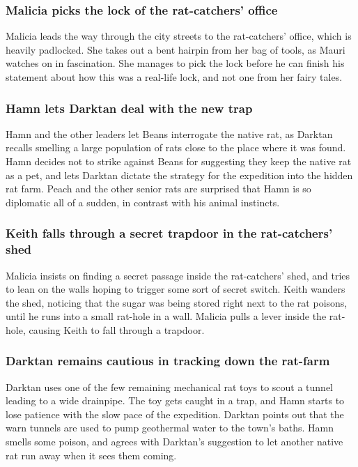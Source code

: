 \subsubsection{\Gls{Malicia} picks the lock of the rat-catchers' office}
\Gls{Malicia} leads the way through the city streets to the rat-catchers' office, which is heavily
padlocked. She takes out a bent hairpin from her bag of tools, as \Gls{Mauri} watches on in
fascination. She manages to pick the lock before he can finish his statement about how this was a
real-life lock, and not one from her fairy tales.

\subsubsection{\Gls{Hamn} lets \Gls{Darktan} deal with the new trap}
\Gls{Hamn} and the other leaders let \Gls{Beans} interrogate the native rat, as \Gls{Darktan}
recalls smelling a large population of rats close to the place where it was found. \Gls{Hamn}
decides not to strike against \Gls{Beans} for suggesting they keep the native rat as a pet, and lets
\Gls{Darktan} dictate the strategy for the expedition into the hidden rat farm. \Gls{Peach} and the
other senior rats are surprised that \Gls{Hamn} is so diplomatic all of a sudden, in contrast with
his animal instincts.

\subsubsection{\Gls{Keith} falls through a secret trapdoor in the rat-catchers' shed}
\Gls{Malicia} insists on finding a secret passage inside the rat-catchers' shed, and tries to lean
on the walls hoping to trigger some sort of secret switch. \Gls{Keith} wanders the shed, noticing
that the sugar was being stored right next to the rat poisons, until he runs into a small rat-hole
in a wall. \Gls{Malicia} pulls a lever inside the rat-hole, causing \Gls{Keith} to fall through a
trapdoor.

\subsubsection{\Gls{Darktan} remains cautious in tracking down the rat-farm}
\Gls{Darktan} uses one of the few remaining mechanical rat toys to scout a tunnel leading to a wide
drainpipe. The toy gets caught in a trap, and \Gls{Hamn} starts to lose patience with the slow pace
of the expedition. \Gls{Darktan} points out that the warn tunnels are used to pump geothermal water
to the town's baths. \Gls{Hamn} smells some poison, and agrees with \Gls{Darktan}'s suggestion to
let another native rat run away when it sees them coming.

